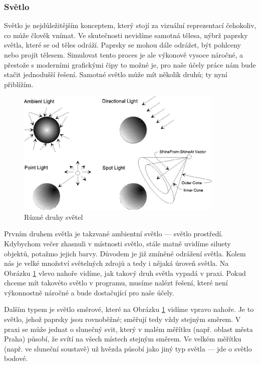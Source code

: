 \documentclass[12pt]{article}
\begin{document}
\subsubsection{Světlo}

Světlo je nejdůležitějším konceptem, který stojí za vizuální reprezentací čehokoliv, co může člověk vnímat. Ve skutečnosti nevidíme samotná tělesa, nýbrž paprsky světla, které se od těles odráží. Paprsky se mohou dále odrážet, být pohlceny nebo projít tělesem. Simulovat tento proces je ale výkonově vysoce náročné, a přestože s moderními grafickými čipy to možné je, pro naše účely práce nám bude stačit jednodušší řešení. Samotné světlo může mít několik druhů; ty nyní přiblížím. \cite{light}

\vspace{0.5cm}
\begin{figure}[h]
    \centering
    \includegraphics[height=6cm]{light_img.jpeg}
    \caption[Různé druhy světel]{Různé druhy světel \cite{light_img}}
    \label{fig:Různé druhy světel}
\end{figure}

Prvním druhem světla je takzvané ambientní světlo — světlo prostředí. Kdybychom večer zhasnuli v místnosti světlo, stále matně uvidíme siluety objektů, potažmo jejich barvy. Důvodem je již zmíněné odrážení světla. Kolem nás je velké množství světelných zdrojů a tedy i nějaká úroveň světla. Na Obrázku \ref{fig:Různé druhy světel} vlevo nahoře vidíme, jak takový druh světla vypadá v praxi. Pokud chceme mít takovéto světlo v programu, musíme nalézt řešení, které není výkonnostně náročné a bude dostačující pro naše účely.

Dalším typem je světlo směrové, které na Obrázku \ref{fig:Různé druhy světel} vidíme vpravo nahoře. Je to světlo, jehož paprsky jsou rovnoběžné; směřují tedy vždy stejným směrem. V praxi se může jednat o slunečný svit, který v malém měřítku (např. oblast města Praha) působí, že svítí na všech místech stejným směrem. Ve velkém měřítku (např. ve sluneční soustavě) už hvězda působí jako jiný typ světla — jde o světlo bodové.
\end{document}
